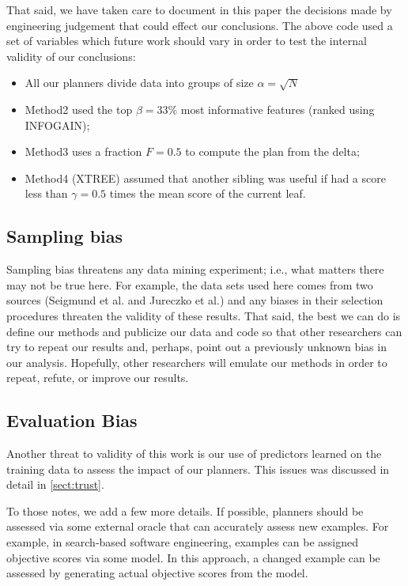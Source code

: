 \documentclass{sig-alternate}
\newcommand{\bi}{\begin{itemize}}
\newcommand{\ei}{\end{itemize}}
\newcommand{\tion}[1]{\textsection\ref{sect:#1}}
\begin{document}
That said, we have taken care to document in this paper the decisions made by engineering
judgement that could effect our conclusions. The above code used a set of variables which future
work should vary in order to test the internal validity of our conclusions:
\bi
\item All our planners divide data into groups of size $\alpha=\sqrt{N}$
\item Method2 used the top $\beta=33\%$ most informative features (ranked using INFOGAIN);
\item Method3 uses a fraction $F=0.5$ to compute the plan from the delta;
\item Method4 (XTREE) assumed that another sibling was useful if  had 
 a  score less than $\gamma=0.5$ times the mean score of the current leaf.
 \ei

\subsection{  Sampling bias} 
Sampling bias threatens any data mining experiment; i.e., what matters
there may not be true here. For example, the data sets used here comes from two sources
(Seigmund et al. and Jureczko et al.) and any biases in their selection procedures
threaten the validity of these results. 
That said,
the best we can do is define our methods and publicize our data and code so that other researchers can
try to repeat our results and, perhaps, point out a previously unknown bias
in our analysis. Hopefully, other researchers will emulate our methods in
order to repeat, refute, or improve our results. 



\subsection{  Evaluation Bias}\label{sect:coc}
Another threat to validity of this work is our use
of predictors learned on the training data to assess the impact of our planners.
This issues was discussed in detail in \tion{trust}. 

To those notes, we add a few more details. If possible, planners should be assessed via some external oracle that can accurately assess new examples. For example, in search-based software engineering,
examples can be assigned objective scores via  some model. In this approach, a changed example can be assessed by
generating actual objective scores from the model. 


\end{document}
